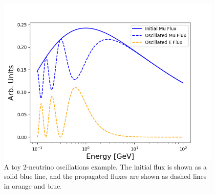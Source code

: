 \documentclass[main.tex]{subfiles}
\begin{document}
\begin{figure}
    \centering
    \includegraphics[width=0.6\linewidth]{figures/oscillations_example.png}
    \caption{A toy 2-neutrino oscillations example. The initial flux is shown as a solid blue line, and the propagated fluxes are shown as dashed lines in orange and blue.}\label{fig:toy_osc}
\end{figure}
\end{document}
